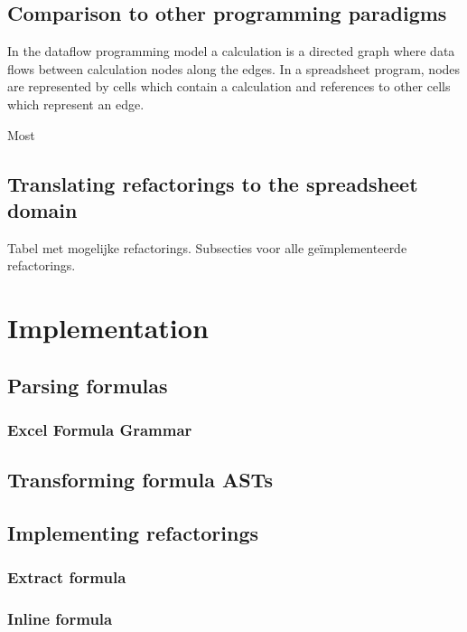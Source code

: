 \documentclass[12pt,a4paper,onecolumn,oneside]{memoir}
\begin{document}
\section{Comparison to other programming paradigms}

In the dataflow programming model a calculation is a directed graph where data flows between calculation nodes along the edges.
In a spreadsheet program, nodes are represented by cells which contain a calculation and references to other cells which represent an edge.

Most 

\section{Translating refactorings to the spreadsheet domain}

Tabel met mogelijke refactorings.
Subsecties voor alle geïmplementeerde refactorings.

\chapter{Implementation}

\section{Parsing formulas}

\subsection{Excel Formula Grammar}

\section{Transforming formula ASTs}

\section{Implementing refactorings}

\subsection{Extract formula}

\subsection{Inline formula}
\end{document}
